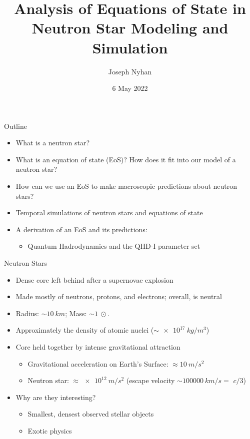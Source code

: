 \documentclass[handout]{beamer}
\title[Analysis of Equations of State]{Analysis of Equations of State in Neutron Star Modeling and Simulation}
\author{Joseph Nyhan}
\date{6 May 2022}
\institute[CoHC]{College of the Holy Cross}
\begin{document}
    \maketitle

    \begin{frame}{Outline}
        \pause
        \begin{itemize}
            \item What is a neutron star? \pause
            \item What is an equation of state (EoS)? \pause How does it fit into our model of a neutron star? \pause
            \item How can we use an EoS to make macroscopic predictions about neutron stars? \pause
            \item Temporal simulations of neutron stars and equations of state
            \item A derivation of an EoS and its predictions: \pause
            \begin{itemize}
                \item Quantum Hadrodynamics and the QHD-I parameter set
            \end{itemize}
        \end{itemize}
    \end{frame}

    \begin{frame}{Neutron Stars}
        \pause
        \begin{itemize}
            \item Dense core left behind after a supernovae explosion
            \item Made mostly of neutrons, protons, and electrons\pause ; overall, is neutral \pause
            \item Radius: $\sim\SI{10}{km}$\pause ; Mass: $\sim\SI{1}{\odot}$. \pause
            \item Approximately the density of atomic nuclei ($\sim\SI{e17}{kg/m^3}$)
            \item Core held together by intense gravitational attraction \pause
            \begin{itemize}
                \item Gravitational acceleration on Earth's Surface: $\approx \SI{10}{m/s^2}$ \pause
                \item Neutron star: $\approx \SI{e12}{m/s^2}$ \pause (escape velocity $\sim \SI{100000}{km/s} = $ \pause $c/3$)\pause
            \end{itemize}
            \item Why are they interesting? \pause \begin{itemize}
                \item Smallest, densest observed stellar objects \pause
                \item Exotic physics
            \end{itemize}
        \end{itemize}
    \end{frame}
\end{document}
